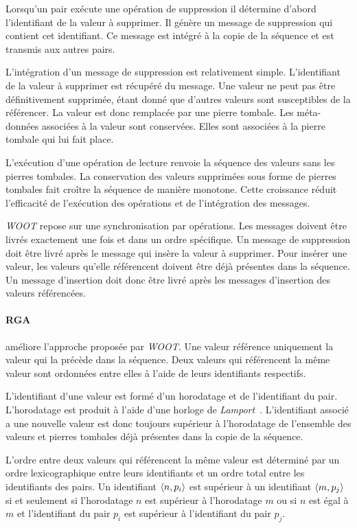 Lorsqu'un pair exécute une opération de suppression il détermine d'abord l'identifiant de la valeur à supprimer.
Il génère un message de suppression qui contient cet identifiant.
Ce message est intégré à la copie de la séquence et est transmis aux autres pairs.

L'intégration d'un message de suppression est relativement simple.
L'identifiant de la valeur à supprimer est récupéré du message.
Une valeur ne peut pas être définitivement supprimée, étant donné que d'autres valeurs sont susceptibles de la référencer.
La valeur est donc remplacée par une pierre tombale.
Les méta-données associées à la valeur sont conservées.
Elles sont associées à la pierre tombale qui lui fait place.

L'exécution d'une opération de lecture renvoie la séquence des valeurs sans les pierres tombales.
La conservation des valeurs supprimées sous forme de pierres tombales fait croître la séquence de manière monotone.
Cette croissance réduit l'efficacité de l'exécution des opérations et de l'intégration des messages.

\emph{WOOT} repose sur une synchronisation par opérations.
Les messages doivent être livrés exactement une fois et dans un ordre spécifique.
Un message de suppression doit être livré après le message qui insère la valeur  à supprimer.
Pour insérer une valeur, les valeurs qu'elle référencent doivent être déjà présentes dans la séquence.
Un message d'insertion doit donc être livré après les messages d'insertion des valeurs référencées.


\paragraph{\acf{RGA}}\autocite{roh_2011_rga} améliore l'approche proposée par \emph{WOOT}.
Une valeur référence uniquement la valeur qui la précède dans la séquence.
Deux valeurs qui référencent la même valeur sont ordonnées entre elles à l'aide de leurs identifiants respectifs.

L'identifiant d'une valeur est formé d'un horodatage et de l'identifiant du pair.
L'horodatage est produit à l'aide d'une horloge de \emph{Lamport}~\autocite{lamport_1978_time}.
L'identifiant associé a une nouvelle valeur est donc toujours supérieur à l'horodatage de l'ensemble des valeurs et pierres tombales déjà présentes dans la copie de la séquence.

L'ordre entre deux valeurs qui référencent la même valeur est déterminé par un ordre lexicographique entre leurs identifiants et un ordre total entre les identifiants des pairs.
Un identifiant $\tuple*{n,p_i}$ est supérieur à un identifiant $\tuple*{m,p_j}$ si et seulement si l'horodatage $n$ est supérieur à l'horodatage $m$ ou si $n$ est égal à $m$ et l'identifiant du pair $p_i$ est supérieur à l'identifiant du pair $p_j$.


